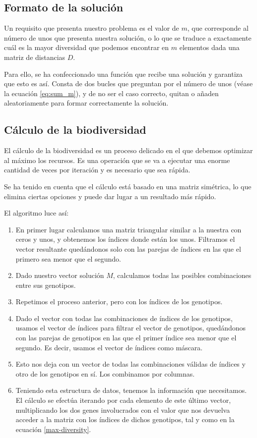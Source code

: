 \subsection{Formato de la solución}
Un requisito que presenta nuestro problema es el valor de $m$, que corresponde al número de unos que presenta nuestra solución, o lo que se traduce a exactamente cuál es la mayor diversidad que podemos encontrar en $m$ elementos dada una matriz de distancias $D$.

Para ello, se ha confeccionado una función  que recibe una solución y garantiza que esto es así. Consta de dos bucles  que preguntan por el número de unos (véase la ecuación \ref{eq:sum_m}), y de no ser el caso correcto, quitan o añaden aleatoriamente para formar correctamente la solución.


\subsection{Cálculo de la biodiversidad}
El cálculo de la biodiversidad es un proceso delicado en el que debemos optimizar al máximo los recursos. Es una operación que se va a ejecutar una enorme cantidad de veces por iteración y es necesario que sea rápida.

Se ha tenido en cuenta que el cálculo está basado en una matriz simétrica, lo que elimina ciertas opciones y puede dar lugar a un resultado más rápido.

El algoritmo luce así:

\begin{enumerate}
    \item En primer lugar calculamos una matriz triangular similar a la nuestra con ceros y unos, y obtenemos los índices donde están los unos. Filtramos el vector resultante quedándonos solo con las parejas de índices en las que el primero sea menor que el segundo.
    \item Dado nuestro vector solución $M$, calculamos todas las posibles combinaciones entre sus genotipos.
    \item Repetimos el proceso anterior, pero con los índices de los genotipos.
    \item Dado el vector con todas las combinaciones de índices de los genotipos, usamos el vector de índices para filtrar el vector de genotipos, quedándonos con las parejas de genotipos en las que el primer índice sea menor que el segundo. Es decir, usamos el vector de índices como máscara.
    \item Esto nos deja con un vector de todas las combinaciones válidas de índices y otro de los genotipos en sí. Los combinamos por columnas.
    \item Teniendo esta estructura de datos, tenemos la información que necesitamos. El cálculo se efectúa iterando por cada elemento de este último vector, multiplicando los dos genes involucrados con el valor que nos devuelva acceder a la matriz con los índices de dichos genotipos, tal y como en la ecuación \ref{max-diversity}.
\end{enumerate}

